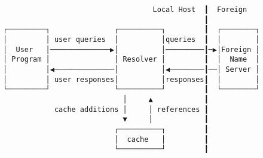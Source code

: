 \documentclass[varwidth=30cm,crop]{standalone}
\begin{document}
\begin{verbatim}
                                   Local Host  ┃  Foreign
                                               ┃
┌─────────┐               ┌──────────┐         ┃  ┌────────┐
│         │ user queries  │          │queries  ┃  │        │
│  User   │──────────────▶│          │─────────┃─▶│Foreign │
│ Program │               │ Resolver │         ┃  │  Name  │
│         │◀──────────────│          │◀────────┃──│ Server │
│         │ user responses│          │responses┃  │        │
└─────────┘               └──────────┘         ┃  └────────┘
                            │     ▲            ┃
            cache additions │     │ references ┃
                            ▼     │            ┃
                          ┌──────────┐         ┃
                          │  cache   │         ┃
                          └──────────┘         ┃
\end{verbatim}
\end{document}
